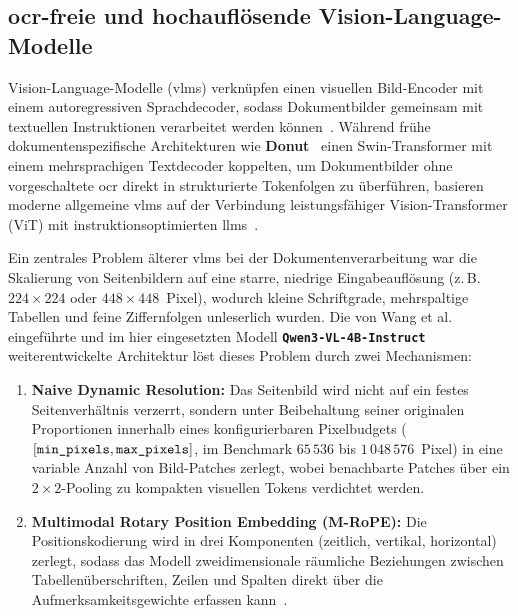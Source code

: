 \subsection{\texorpdfstring{\ac{ocr}}{OCR}-freie und hochauflösende Vision-Language-Modelle}
\label{subsec:vlm-grundlagen}

Vision-Language-Modelle (\acp{vlm}) verknüpfen einen visuellen Bild-Encoder mit einem autoregressiven Sprachdecoder, sodass Dokumentbilder gemeinsam mit textuellen Instruktionen verarbeitet werden können~\cite{Kim2022Donut,Liu2023VisualInstruction}. Während frühe dokumentenspezifische Architekturen wie \textbf{Donut}~\cite{Kim2022Donut} einen Swin-Transformer mit einem mehrsprachigen Textdecoder koppelten, um Dokumentbilder ohne vorgeschaltete \ac{ocr} direkt in strukturierte Tokenfolgen zu überführen, basieren moderne allgemeine \acp{vlm} auf der Verbindung leistungsfähiger Vision-Transformer (ViT) mit instruktionsoptimierten \acp{llm}~\cite{Liu2023VisualInstruction,Wang2024Qwen2VL}.

Ein zentrales Problem älterer \acp{vlm} bei der Dokumentenverarbeitung war die Skalierung von Seitenbildern auf eine starre, niedrige Eingabeauflösung (z.\,B.\ $224 \times 224$ oder $448 \times 448$~Pixel), wodurch kleine Schriftgrade, mehrspaltige Tabellen und feine Ziffernfolgen unleserlich wurden. Die von Wang et al.~\cite{Wang2024Qwen2VL} eingeführte und im hier eingesetzten Modell \textbf{\texttt{Qwen3-VL-4B-Instruct}}~\cite{QwenSelectionVisionCard} weiterentwickelte Architektur löst dieses Problem durch zwei Mechanismen:
\begin{enumerate}
  \item \textbf{Naive Dynamic Resolution:} Das Seitenbild wird nicht auf ein festes Seitenverhältnis verzerrt, sondern unter Beibehaltung seiner originalen Proportionen innerhalb eines konfigurierbaren Pixelbudgets ($[\text{\texttt{min\_pixels}}, \text{\texttt{max\_pixels}}]$, im Benchmark $65\,536$ bis $1\,048\,576$~Pixel) in eine variable Anzahl von Bild-Patches zerlegt, wobei benachbarte Patches über ein $2 \times 2$-Pooling zu kompakten visuellen Tokens verdichtet werden.
  \item \textbf{Multimodal Rotary Position Embedding (M-RoPE):} Die Positionskodierung wird in drei Komponenten (zeitlich, vertikal, horizontal) zerlegt, sodass das Modell zweidimensionale räumliche Beziehungen zwischen Tabellenüberschriften, Zeilen und Spalten direkt über die Aufmerksamkeitsgewichte erfassen kann~\cite{Wang2024Qwen2VL}.
\end{enumerate}

